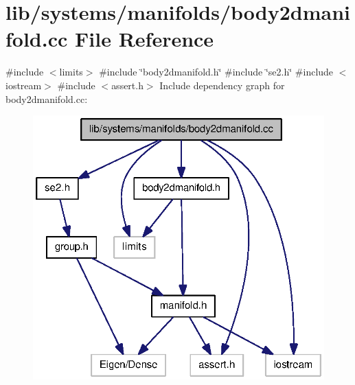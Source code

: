 \section{lib/systems/manifolds/body2dmanifold.cc \-File \-Reference}
\label{body2dmanifold_8cc}
{\ttfamily \#include $<$limits$>$}\*
{\ttfamily \#include \char`\"{}body2dmanifold.\-h\char`\"{}}\*
{\ttfamily \#include \char`\"{}se2.\-h\char`\"{}}\*
{\ttfamily \#include $<$iostream$>$}\*
{\ttfamily \#include $<$assert.\-h$>$}\*
\-Include dependency graph for body2dmanifold.\-cc\-:
\nopagebreak
\begin{figure}[H]
\begin{center}
\leavevmode
\includegraphics[width=323pt]{body2dmanifold_8cc__incl}
\end{center}
\end{figure}
